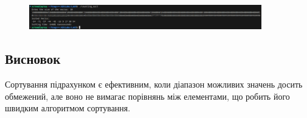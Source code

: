 \documentclass[12pt]{extarticle}
\begin{document}
\vspace{12pt}
\begin{figure}[H]
    \centering
    \includegraphics[width=0.90\textwidth]{Screenshot_20231018_010132.png}
    \caption{}
\end{figure}
\subsection*{Висновок} 
Сортування підрахунком є ефективним, коли діапазон можливих 
значень досить обмежений, але воно не вимагає порівнянь між
 елементами, що робить його швидким алгоритмом сортування.
\end{document}
